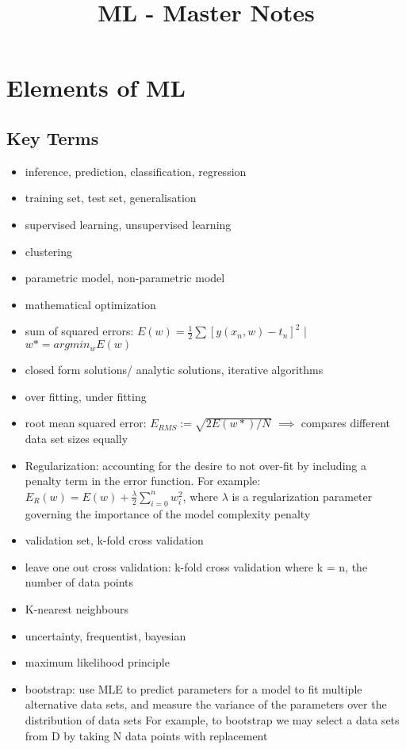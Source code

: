 \documentclass[a4paper]{article}
\title{ML - Master Notes}
\begin{document}
	\maketitle
	
	\section{Elements of ML}
	
	\subsection{Key Terms}
	
	\begin{itemize}
		 
		\item inference, prediction, classification, regression
		\item training set, test set, generalisation
		\item supervised learning, unsupervised learning
		\item clustering
		\item parametric model, non-parametric model
		\item mathematical optimization
		\item sum of squared errors: $E(w) = \frac{1}{2}\sum{[y(x_n, w) - t_n]^2}$ | $w* = argmin_w E(w)$
		\item closed form solutions/ analytic solutions, iterative algorithms
		\item over fitting, under fitting
		\item root mean squared error: $E_{RMS} := \sqrt{2E(w*)/N}$ $\implies$ compares different data set sizes equally
		\item Regularization: accounting for the desire to not over-fit by including a penalty term in the error function. For example:
			$E_R(w) = E(w) + \frac{\lambda}{2}\sum_{i=0}^{n}{w_i^2}$, where $\lambda$ is a regularization parameter governing the importance of the model complexity penalty
		
		\item validation set, k-fold cross validation
		\item leave one out cross validation: k-fold cross validation where k = n, the number of data points
		\item K-nearest neighbours
		\item uncertainty, frequentist, bayesian
		\item maximum likelihood principle
		\item bootstrap: use MLE to predict parameters for a model to fit multiple alternative data sets,
		and measure the variance of the parameters over the distribution of data sets
		For example, to bootstrap we may select a data sets from D by taking N data points with replacement
		

\end{itemize}
\end{document}
